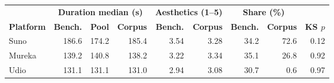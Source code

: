 \begin{tabular}{lrrrrrrrr}
\toprule
 & \multicolumn{3}{c}{\textbf{Duration median (s)}} & \multicolumn{2}{c}{\textbf{Aesthetics (1--5)}} & \multicolumn{2}{c}{\textbf{Share (\%)}} & \\
\cmidrule(lr){2-4}\cmidrule(lr){5-6}\cmidrule(lr){7-8}
\textbf{Platform} & \textbf{Bench.} & \textbf{Pool} & \textbf{Corpus} & \textbf{Bench.} & \textbf{Corpus} & \textbf{Bench.} & \textbf{Corpus} & \textbf{KS $p$} \\
\midrule
Suno & 186.6 & 174.2 & 185.4 & 3.54 & 3.28 & 34.2 & 72.6 & 0.12 \\
Mureka & 139.2 & 140.8 & 138.2 & 3.22 & 3.34 & 35.1 & 26.8 & 0.92 \\
Udio & 131.1 & 131.1 & 131.0 & 2.94 & 3.08 & 30.7 & 0.6 & 0.97 \\
\bottomrule
\end{tabular}
